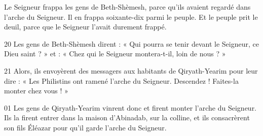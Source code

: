 Le Seigneur frappa les gens de Beth-Shèmesh, parce qu’ils avaient regardé dans l’arche du Seigneur. Il en frappa soixante-dix parmi le peuple. Et le peuple prit le deuil, parce que le Seigneur l’avait durement frappé.

20 Les gens de Beth-Shèmesh dirent : « Qui pourra se tenir devant le Seigneur, ce Dieu saint ? » et : « Chez qui le Seigneur montera-t-il, loin de nous ? »

21 Alors, ils envoyèrent des messagers aux habitants de Qiryath-Yearim pour leur dire : « Les Philistins ont ramené l’arche du Seigneur. Descendez ! Faites-la monter chez vous ! »

01 Les gens de Qiryath-Yearim vinrent donc et firent monter l’arche du Seigneur. Ils la firent entrer dans la maison d’Abinadab, sur la colline, et ils consacrèrent son fils Éléazar pour qu’il garde l’arche du Seigneur.

